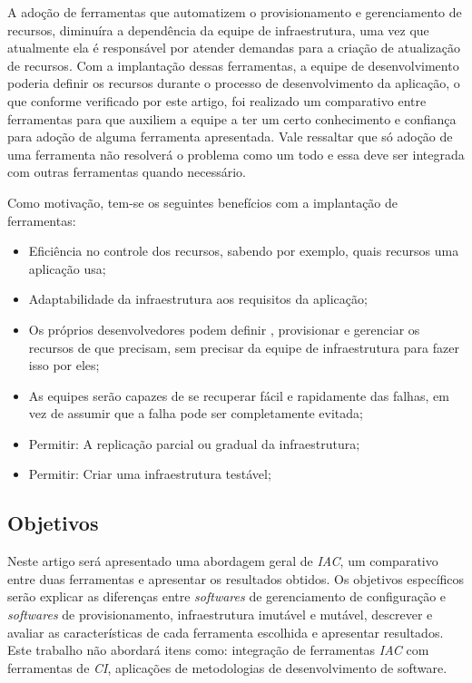  A adoção de ferramentas que automatizem o provisionamento e gerenciamento de recursos, diminuíra a dependência da equipe de infraestrutura, uma vez que atualmente ela é responsável por atender demandas para a criação de atualização de recursos. Com a implantação dessas ferramentas, a equipe de desenvolvimento poderia definir os recursos durante o processo de desenvolvimento da aplicação, o que conforme verificado por este artigo, foi realizado um comparativo entre ferramentas para que auxiliem a equipe a ter um certo conhecimento e confiança para adoção de alguma ferramenta apresentada. Vale ressaltar que só adoção de uma ferramenta não resolverá o problema como um todo e essa deve ser integrada com outras ferramentas quando necessário. 

  Como motivação, tem-se os seguintes benefícios com a implantação de ferramentas:  
\begin{itemize}
 \item Eficiência no controle dos recursos, sabendo por exemplo, quais recursos uma aplicação usa;
 \item Adaptabilidade da infraestrutura aos requisitos da aplicação;
 \item Os próprios desenvolvedores podem definir , provisionar e gerenciar os recursos de que precisam, sem precisar da equipe de infraestrutura para fazer isso por eles;

\item As equipes serão capazes de se recuperar fácil e rapidamente das falhas, em vez de assumir que a falha pode ser completamente evitada;

\item Permitir: A replicação parcial ou gradual da infraestrutura;

\item Permitir: Criar uma infraestrutura testável;
\end{itemize} 


\subsection{Objetivos}

Neste artigo será apresentado uma abordagem geral de \textit{IAC}, um comparativo entre duas ferramentas e apresentar os resultados obtidos. Os objetivos específicos serão explicar as diferenças entre \textit{softwares} de gerenciamento de configuração e \textit{softwares} de provisionamento, infraestrutura imutável e mutável, descrever e avaliar as características de cada ferramenta escolhida e apresentar resultados. Este trabalho não abordará itens como: integração de ferramentas \textit{IAC} com ferramentas de \textit{CI}, aplicações de metodologias de desenvolvimento de software. 


